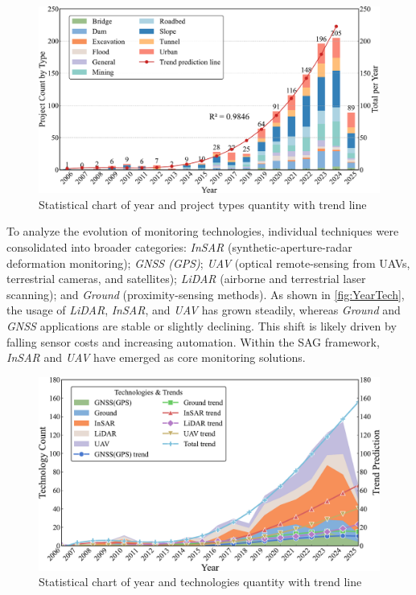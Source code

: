 \documentclass[preprint,11pt,authoryear,3p]{elsarticle}
\begin{document}
\begin{figure}[htbp]
    \centering
    \includegraphics[width=\textwidth]{./imgs/Year_Types.pdf}
    \caption{Statistical chart of year and project types quantity with trend line}
    \label{fig:YearProject}
\end{figure}

To analyze the evolution of monitoring technologies, individual techniques were consolidated into broader categories: \emph{InSAR} (synthetic-aperture-radar deformation monitoring); \emph{GNSS (GPS)}; \emph{UAV} (optical remote-sensing from UAVs, terrestrial cameras, and satellites); \emph{LiDAR} (airborne and terrestrial laser scanning); and \emph{Ground} (proximity-sensing methods). As shown in \autoref{fig:YearTech}, the usage of \emph{LiDAR}, \emph{InSAR}, and \emph{UAV} has grown steadily, whereas \emph{Ground} and \emph{GNSS} applications are stable or slightly declining. This shift is likely driven by falling sensor costs and increasing automation. Within the SAG framework, \emph{InSAR} and \emph{UAV} have emerged as core monitoring solutions.

\begin{figure}[htbp]
    \centering
    \includegraphics[width=\textwidth]{./imgs/Year_Tech.pdf}
    \caption{Statistical chart of year and technologies quantity with trend line}
    \label{fig:YearTech}
\end{figure}
\end{document}
